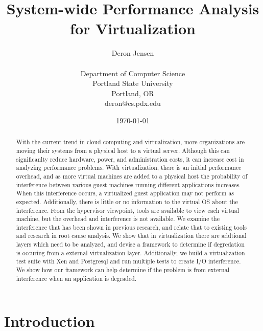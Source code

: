 \documentclass[10pt,onecolumn,oneside]{article}
\begin{document}
\title{System-wide Performance Analysis for Virtualization}
\author{Deron Jensen\\
\\
Department of Computer Science\\
Portland State University\\
Portland, OR \\
deron@cs.pdx.edu \\
}
\date{\today}
  \maketitle

\begin{abstract}
With the current trend in cloud computing and virtualization, more organizations are moving their systems from a physical host to a virtual server.  Although this can significanlty reduce hardware, power, and administration costs, it can increase cost in analyzing performance problems.  With virtualization, there is an initial performance overhead, and as more virtual machines are added to a physical host the probability of interference between various guest machines running different applications increases.  When this interference occurs, a virtualized guest application may not perform as expected.  Additionally, there is little or no information to the virtual OS about the interference.  From the hypervisor viewpoint, tools are available to view each virtual machine, but the overhead and interference is not available. \newline
\indent  We examine the interference that has been shown in previous research, and relate that to existing tools and research in root cause analysis.  We show that in virtualization there are addtional layers which need to be analyzed, and devise a framework to determine if degredation is occuring from a external virtualization layer.  Additionally, we build a virtualization test suite with Xen and Postgresql and run multiple tests to create I/O interference.  We show how our framework can help determine if the problem is from external interference when an application is degraded.   
  \end{abstract}

\onecolumn
\section{Introduction}

\end{document}

